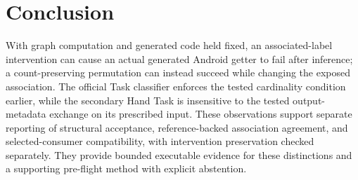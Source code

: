\documentclass[10pt,twocolumn,letterpaper]{article}
\begin{document}
\section{Conclusion}
With graph computation and generated code held fixed, an associated-label intervention can cause an actual generated Android getter to fail after inference; a count-preserving permutation can instead succeed while changing the exposed association. The official Task classifier enforces the tested cardinality condition earlier, while the secondary Hand Task is insensitive to the tested output-metadata exchange on its prescribed input. These observations support separate reporting of structural acceptance, reference-backed association agreement, and selected-consumer compatibility, with intervention preservation checked separately. They provide bounded executable evidence for these distinctions and a supporting pre-flight method with explicit abstention.
\end{document}
